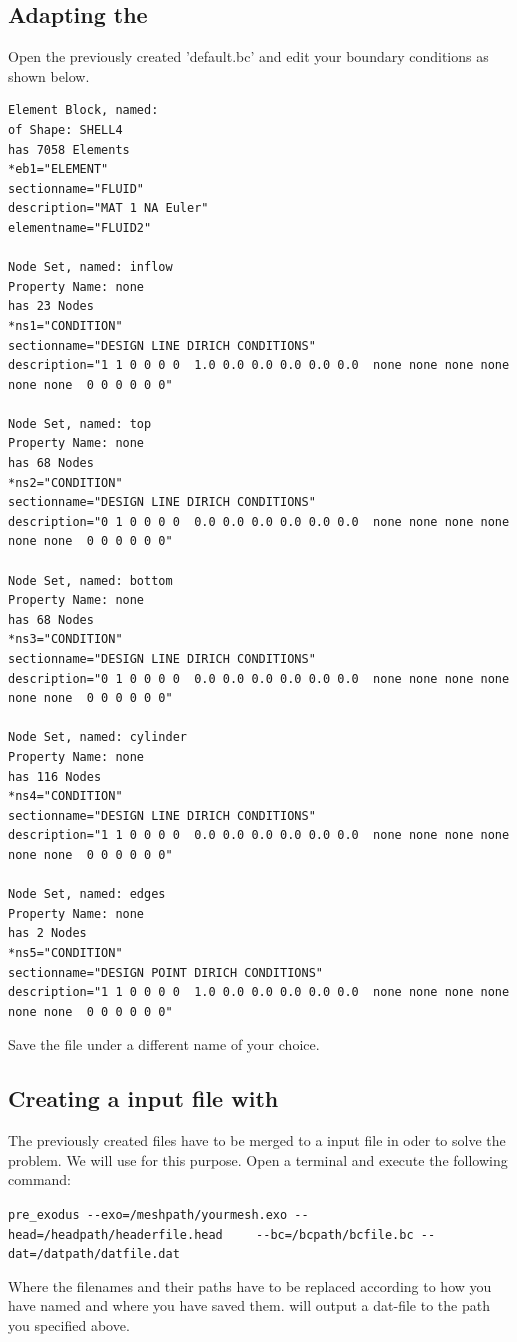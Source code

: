 \subsection{Adapting the \bc}
Open the previously created \bc 'default.bc' and edit your boundary conditions as shown below.


 \begin{small} \begin{verbatim}
Element Block, named: 
of Shape: SHELL4
has 7058 Elements
*eb1="ELEMENT"
sectionname="FLUID"
description="MAT 1 NA Euler"
elementname="FLUID2"

Node Set, named: inflow
Property Name: none
has 23 Nodes
*ns1="CONDITION"
sectionname="DESIGN LINE DIRICH CONDITIONS"
description="1 1 0 0 0 0  1.0 0.0 0.0 0.0 0.0 0.0  none none none none none none  0 0 0 0 0 0"

Node Set, named: top
Property Name: none
has 68 Nodes
*ns2="CONDITION"
sectionname="DESIGN LINE DIRICH CONDITIONS"
description="0 1 0 0 0 0  0.0 0.0 0.0 0.0 0.0 0.0  none none none none none none  0 0 0 0 0 0"

Node Set, named: bottom
Property Name: none
has 68 Nodes
*ns3="CONDITION"
sectionname="DESIGN LINE DIRICH CONDITIONS"
description="0 1 0 0 0 0  0.0 0.0 0.0 0.0 0.0 0.0  none none none none none none  0 0 0 0 0 0"

Node Set, named: cylinder
Property Name: none
has 116 Nodes
*ns4="CONDITION"
sectionname="DESIGN LINE DIRICH CONDITIONS"
description="1 1 0 0 0 0  0.0 0.0 0.0 0.0 0.0 0.0  none none none none none none  0 0 0 0 0 0"

Node Set, named: edges
Property Name: none
has 2 Nodes
*ns5="CONDITION"
sectionname="DESIGN POINT DIRICH CONDITIONS"
description="1 1 0 0 0 0  1.0 0.0 0.0 0.0 0.0 0.0  none none none none none none  0 0 0 0 0 0"
 \end{verbatim} \end{small}
Save the file under a different name of your choice.

\subsection{Creating a \baci{} input file with \prexo}
The previously created files have to be merged to a \baci{} input file in oder 
to solve the problem. We will use \prexo for this purpose. Open a terminal 
and execute the following command:
\begin{center}
  \verb|pre_exodus --exo=/meshpath/yourmesh.exo --head=/headpath/headerfile.head|
  \verb|	--bc=/bcpath/bcfile.bc --dat=/datpath/datfile.dat|
\end{center}
Where the filenames and their paths have to be replaced according to how you have named and where you have saved them.
\prexo will output a dat-file to the path you specified above.


